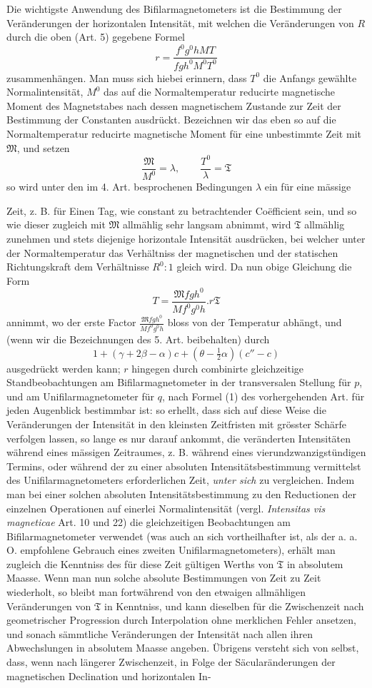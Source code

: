 Die wichtigste Anwendung des Bifilarmagnetometers ist die Bestimmung der Veränderungen der horizontalen Intensität, mit welchen die Veränderungen von $R$ durch die oben (Art. 5) gegebene Formel
\[
r=\frac{f^0g^0hMT}{fgh^0M^0T^0}
\]
zusammenhängen. Man muss sich hiebei erinnern, dass $T^0$ die Anfangs gewählte Normalintensität, $M^0$ das auf die Normaltemperatur reducirte magnetische Moment des Magnetstabes nach dessen magnetischem Zustande zur Zeit der Bestimmung der Constanten ausdrückt. Bezeichnen wir das eben so auf die Normaltemperatur reducirte magnetische Moment für eine unbestimmte Zeit mit $\mathfrak{M}$, und setzen
\[
\frac{\mathfrak{M}}{M^0}=\lambda,\qquad\frac{T^0}{\lambda}=\mathfrak{T}
\]
so wird unter den im 4. Art. besprochenen Bedingungen $\lambda$ ein für eine mässige
\par\clearpage
{}
\noindent Zeit, z. B. für Einen Tag, wie constant zu betrachtender Coëfficient sein, und so wie dieser zugleich mit $\mathfrak{M}$ allmählig sehr langsam abnimmt, wird $\mathfrak{T}$ allmählig zunehmen und stets diejenige horizontale Intensität ausdrücken, bei welcher unter der Normaltemperatur das Verhältniss der magnetischen und der statischen Richtungskraft dem Verhältnisse $R^0:1$ gleich wird. Da nun obige Gleichung die Form
\[
T=\frac{\mathfrak{M}fgh^0}{Mf^0g^0h}.r\mathfrak{T}
\]
annimmt, wo der erste Factor $\frac{\mathfrak{M}fgh^0}{Mf^0g^0h}$ bloss von der Temperatur abhängt, und (wenn wir die Bezeichnungen des 5. Art. beibehalten) durch
\[
1+(\gamma+2\beta-\alpha)c+(\theta-\tfrac12\alpha)(c''-c)
\]
ausgedrückt werden kann; $r$ hingegen durch combinirte gleichzeitige Standbeobachtungen am Bifilarmagnetometer in der transversalen Stellung für $p$, und am Unifilarmagnetometer für $q$, nach Formel (1) des vorhergehenden Art. für jeden Augenblick bestimmbar ist: so erhellt, dass sich auf diese Weise die Veränderungen der Intensität in den kleinsten Zeitfristen mit grösster Schärfe verfolgen lassen, so lange es nur darauf ankommt, die veränderten Intensitäten während eines mässigen Zeitraumes, z. B. während eines vierundzwanzigstündigen Termins, oder während der zu einer absoluten Intensitätsbestimmung vermittelst des Unifilarmagnetometers erforderlichen Zeit, \textit{unter sich} zu vergleichen. Indem man bei einer solchen absoluten Intensitätsbestimmung zu den Reductionen der einzelnen Operationen auf einerlei Normalintensität (vergl. \textit{Intensitas vis magneticae} Art. 10 und 22) die gleichzeitigen Beobachtungen am Bifilarmagnetometer verwendet (was auch an sich vortheilhafter ist, als der a. a. O. empfohlene Gebrauch eines zweiten Unifilarmagnetometers), erhält man zugleich die Kenntniss des für diese Zeit gültigen Werths von $\mathfrak{T}$ in absolutem Maasse. Wenn man nun solche absolute Bestimmungen von Zeit zu Zeit wiederholt, so bleibt man fortwährend von den etwaigen allmähligen Veränderungen von $\mathfrak{T}$ in Kenntniss, und kann dieselben für die Zwischenzeit nach geometrischer Progression durch Interpolation ohne merklichen Fehler ansetzen, und sonach sämmtliche Veränderungen der Intensität nach allen ihren Abwechslungen in absolutem Maasse angeben. Übrigens versteht sich von selbst, dass, wenn nach längerer Zwischenzeit, in Folge der Säcularänderungen der magnetischen Declination und horizontalen In-
